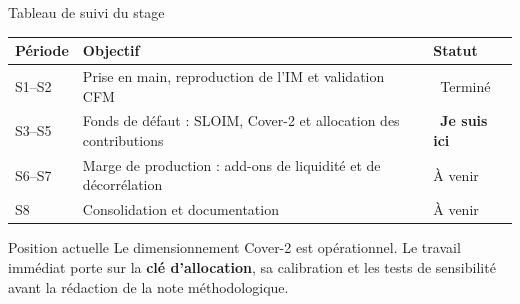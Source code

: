 \documentclass[10pt,aspectratio=169]{beamer}
\newcommand{\keyword}[1]{\textcolor{AccentBlue}{\textbf{#1}}}
\newcommand{\done}{\textcolor{SuccessGreen}{\ding{51}}}
\newcommand{\current}{\textcolor{Gold}{\raisebox{-0.15ex}{\Large\ding{43}}}}
\begin{document}
\begin{frame}{Tableau de suivi du stage}
  \small
  \renewcommand{\arraystretch}{1.45}
  \centering
  \begin{tabular}{p{1.25cm}p{7.5cm}p{2.5cm}}
    \toprule
    \textbf{Période} & \textbf{Objectif} & \textbf{Statut} \\
    \midrule
    S1--S2
      & Prise en main, reproduction de l'IM et validation CFM
      & \done\ Terminé \\
    \rowcolor{yellow!12}
    S3--S5
      & Fonds de défaut : SLOIM, Cover-2 et allocation des contributions
      & \current\ \textbf{Je suis ici} \\
    S6--S7
      & Marge de production : add-ons de liquidité et de décorrélation
      & \textcolor{FutureGray}{À venir} \\
    S8
      & Consolidation et documentation
      & \textcolor{FutureGray}{À venir} \\
    \bottomrule
  \end{tabular}

  \vspace{0.45cm}
  \begin{block}{Position actuelle}
    Le dimensionnement Cover-2 est opérationnel. Le travail immédiat porte
    sur la \keyword{clé d'allocation}, sa calibration et les tests de
    sensibilité avant la rédaction de la note méthodologique.
  \end{block}
\end{frame}
\end{document}
